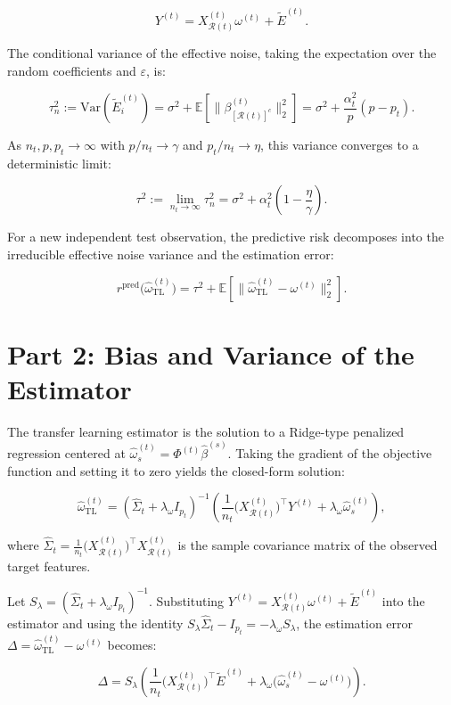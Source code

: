 \documentclass{article}
\begin{document}
\[
Y^{(t)} = X_{\mathcal{R}(t)}^{(t)}\omega^{(t)} + \tilde{E}^{(t)}.
\]

The conditional variance of the effective noise, taking the expectation over the random coefficients and $\varepsilon$, is:

\[
\tau_n^2 := \mathrm{Var}(\tilde{E}_i^{(t)}) = \sigma^2 + \mathbb{E}\left[\|\beta_{[\mathcal{R}(t)]^c}^{(t)}\|_2^2\right] = \sigma^2 + \frac{\alpha_t^2}{p}(p - p_t).
\]

As $n_t, p, p_t \to \infty$ with $p/n_t \to \gamma$ and $p_t/n_t \to \eta$, this variance converges to a deterministic limit:

\[
\tau^2 := \lim_{n_t \to \infty} \tau_n^2 = \sigma^2 + \alpha_t^2\left(1 - \frac{\eta}{\gamma}\right).
\]

For a new independent test observation, the predictive risk decomposes into the irreducible effective noise variance and the estimation error:

\[
r^{\mathrm{pred}}\!\bigl(\hat\omega_{\mathrm{TL}}^{(t)}\bigr) = \tau^2 + \mathbb{E}\left[\bigl\|\hat\omega_{\mathrm{TL}}^{(t)} - \omega^{(t)}\bigr\|_2^2\right].
\]

\section*{Part 2: Bias and Variance of the Estimator}

The transfer learning estimator is the solution to a Ridge-type penalized regression centered at $\hat{\omega}_s^{(t)} = \Phi^{(t)}\hat{\beta}^{(s)}$. Taking the gradient of the objective function and setting it to zero yields the closed-form solution:

\[
\hat\omega_{\mathrm{TL}}^{(t)} = (\hat{\Sigma}_t + \lambda_\omega I_{p_t})^{-1} \left( \frac{1}{n_t} \bigl(X_{\mathcal{R}(t)}^{(t)}\bigr)^\top Y^{(t)} + \lambda_\omega \hat{\omega}_s^{(t)} \right),
\]

where $\hat{\Sigma}_t = \frac{1}{n_t} \bigl(X_{\mathcal{R}(t)}^{(t)}\bigr)^\top X_{\mathcal{R}(t)}^{(t)}$ is the sample covariance matrix of the observed target features.

Let $S_\lambda = (\hat{\Sigma}_t + \lambda_\omega I_{p_t})^{-1}$. Substituting $Y^{(t)} = X_{\mathcal{R}(t)}^{(t)}\omega^{(t)} + \tilde{E}^{(t)}$ into the estimator and using the identity $S_\lambda \hat{\Sigma}_t - I_{p_t} = -\lambda_\omega S_\lambda$, the estimation error $\Delta = \hat\omega_{\mathrm{TL}}^{(t)} - \omega^{(t)}$ becomes:

\[
\Delta = S_\lambda \left( \frac{1}{n_t} \bigl(X_{\mathcal{R}(t)}^{(t)}\bigr)^\top \tilde{E}^{(t)} + \lambda_\omega \bigl(\hat{\omega}_s^{(t)} - \omega^{(t)}\bigr) \right).
\]
\end{document}
